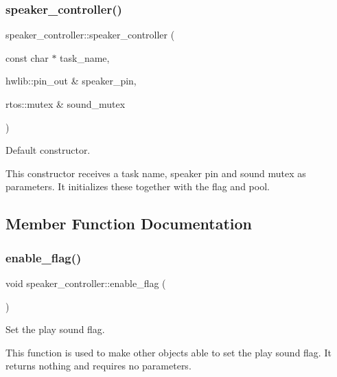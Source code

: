 \subsubsection{\texorpdfstring{speaker\+\_\+controller()}{speaker\_controller()}}
{\footnotesize\ttfamily speaker\+\_\+controller\+::speaker\+\_\+controller (\begin{DoxyParamCaption}\item[{const char $\ast$}]{task\+\_\+name,  }\item[{hwlib\+::pin\+\_\+out \&}]{speaker\+\_\+pin,  }\item[{rtos\+::mutex \&}]{sound\+\_\+mutex }\end{DoxyParamCaption})\hspace{0.3cm}{\ttfamily [inline]}}



Default constructor. 

This constructor receives a task name, speaker pin and sound mutex as parameters. It initializes these together with the flag and pool. 

\subsection{Member Function Documentation}
\hypertarget{classspeaker__controller_ac960be64207122d099dab24de3928d98}{}\label{classspeaker__controller_ac960be64207122d099dab24de3928d98} 
\subsubsection{\texorpdfstring{enable\+\_\+flag()}{enable\_flag()}}
{\footnotesize\ttfamily void speaker\+\_\+controller\+::enable\+\_\+flag (\begin{DoxyParamCaption}{ }\end{DoxyParamCaption})\hspace{0.3cm}{\ttfamily [inline]}}



Set the play sound flag. 

This function is used to make other objects able to set the play sound flag. It returns nothing and requires no parameters. \hypertarget{classspeaker__controller_a13df562814c54591d83e4dd05e6930ca}{}\label{classspeaker__controller_a13df562814c54591d83e4dd05e6930ca} 
